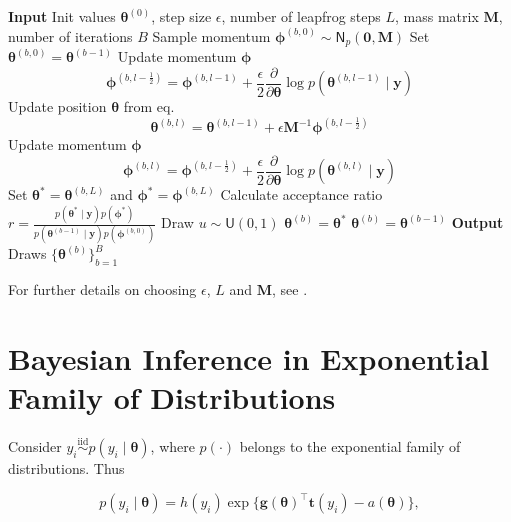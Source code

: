\begin{algorithm}[H]
\caption{Hamiltonian Monte Carlo (HMC)}
\begin{algorithmic}
\State \textbf{Input} Init values $\bm{\theta}^{(0)}$, step size $\epsilon$, number of leapfrog steps $L$, mass matrix $\bm{M}$, number of iterations $B$
  \State Sample momentum $\bm{\phi}^{(b,0)} \sim \mathsf{N}_p(\bm{0},\bm{M})$
  \State Set $\bm{\theta}^{(b,0)}=\bm{\theta}^{(b-1)}$
    \State Update momentum $\bm{\phi}$
    $$
        \bm{\phi}^{(b,l-\frac{1}{2})}
        =
        \bm{\phi}^{(b,l-1)}+\frac{\epsilon}{2}\frac{\partial}{\partial\bm{\theta}}\log p\!\left(\bm{\theta}^{(b,l-1)}\mid \bm{y}\right)
        $$
    \State Update position $\bm{\theta}$ from eq. 
    $$
        \bm{\theta}^{(b,l)}
        =
        \bm{\theta}^{(b,l-1)}+\epsilon\bm{M}^{-1}\bm{\phi}^{(b,l-\frac{1}{2})}
        $$
    \State Update momentum $\bm{\phi}$
    $$
        \bm{\phi}^{(b,l)}
        =
        \bm{\phi}^{(b,l-\frac{1}{2})}+\frac{\epsilon}{2}\frac{\partial}{\partial\bm{\theta}}\log p\!\left(\bm{\theta}^{(b,l)}\mid \bm{y}\right)
        $$
  \EndFor
  \State Set $\bm{\theta}^{*}=\bm{\theta}^{(b,L)}$ and $\bm{\phi}^{*}=\bm{\phi}^{(b,L)}$
  \State Calculate acceptance ratio $r=\frac{p(\bm{\theta}^{*}\mid \bm{y})p(\bm{\phi}^{*})}{p(\bm{\theta}^{(b-1)}\mid \bm{y})p(\bm{\phi}^{(b,0)})}$ 
  \State Draw $u \sim \mathsf{U}(0,1)$
    \State $\bm{\theta}^{(b)} = \bm{\theta}^*$
  \Else
    \State $\bm{\theta}^{(b)} = \bm{\theta}^{(b-1)}$
  \EndIf
\EndFor
\State \textbf{Output} Draws $\{\bm{\theta}^{(b)}\}_{b=1}^B$
\end{algorithmic}
\end{algorithm}


For further details on choosing $\epsilon$, $L$ and $\bm{M}$, see \cite{GELMAN14}.




\section{Bayesian Inference in Exponential Family of Distributions}

Consider $y_i\stackrel{\text{iid}}\sim p(y_i\mid\bm{\theta})$, where $p(\cdot)$ belongs to the exponential family of distributions. Thus

\begin{equation}
\label{dist_FED}
    p(y_i\mid\bm{\theta}) = h(y_i)\exp{\lbrace{\bm{g(\bm{\theta})}^\top \bm{t}\left(y_i\right)}-a(\bm{\theta})\rbrace},
\end{equation}

